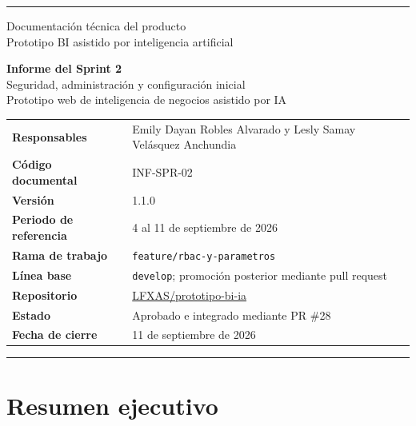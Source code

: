 \documentclass[11pt,letterpaper]{article}
\newcommand{\file}[1]{\texttt{#1}}
\begin{document}
\hypersetup{pageanchor=false}

\begin{titlepage}
  \thispagestyle{empty}
  \vspace*{0.8cm}
  {\color{ugblue}\rule{\textwidth}{2.8pt}}
  \vspace{1.2cm}

  {\Large Documentación técnica del producto\\[0.25em]
  Prototipo BI asistido por inteligencia artificial}

  \vfill

  {\color{deepgreen}\fontsize{29}{35}\selectfont\textbf{Informe del Sprint 2}}\\[0.7em]
  {\LARGE Seguridad, administración y configuración inicial}\\[0.6em]
  {\large Prototipo web de inteligencia de negocios asistido por IA}

  \vspace{1.5cm}

  \begin{tabularx}{\textwidth}{@{}>{\bfseries}l X@{}}
    Responsables & Emily Dayan Robles Alvarado y Lesly Samay Velásquez Anchundia \\
    Código documental & INF-SPR-02 \\
    Versión & 1.1.0 \\
    Periodo de referencia & 4 al 11 de septiembre de 2026 \\
    Rama de trabajo & \file{feature/rbac-y-parametros} \\
    Línea base & \file{develop}; promoción posterior mediante pull request \\
    Repositorio & \href{https://github.com/LFXAS/prototipo-bi-ia}{LFXAS/prototipo-bi-ia} \\
    Estado & Aprobado e integrado mediante PR \#28 \\
    Fecha de cierre & 11 de septiembre de 2026 \\
  \end{tabularx}

  \vfill
  {\color{ugblue}\rule{\textwidth}{2.8pt}}
\end{titlepage}

\hypersetup{pageanchor=true}
\tableofcontents
\newpage
{}

\section{Resumen ejecutivo}
\end{document}
